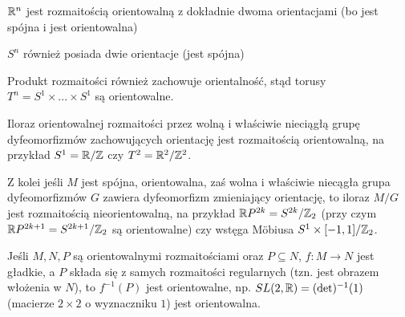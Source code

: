 \begin{example}
\item $\mathbb{R}^n$ jest rozmaitością orientowalną z dokładnie dwoma orientacjami (bo jest spójna i jest orientowalna)
\item $S^n$ również posiada dwie orientacje (jest spójna)
\item Produkt rozmaitości również zachowuje orientalność, stąd torusy $T^n=S^1\times...\times S^1$ są orientowalne.
\item Iloraz orientowalnej rozmaitości przez wolną i właściwie nieciągłą grupę dyfeomorfizmów zachowujących orientację jest rozmaitością orientowalną, na przykład $S^1=\mathbb{R}/\mathbb{Z}$ czy $T^2=\mathbb{R}^2/\mathbb{Z}^2$. 

  Z kolei jeśli $M$ jest spójna, orientowalna, zaś wolna i właściwie niecągła grupa dyfeomorfizmów $G$ zawiera dyfeomorfizm zmieniający orientację, to iloraz $M/G$ jest rozmaitością nieorientowalną, na przykład $\mathbb{R} P^{2k}=S^{2k}/\mathbb{Z}_2$ (przy czym $\mathbb{R} P^{2k+1}=S^{2k+1}/\mathbb{Z}_2$ są orientowalne) czy wstęga M\"obiusa $S^1\times [-1,1]/\mathbb{Z}_2$.
\item Jeśli $M,N,P$ są orientowalnymi rozmaitościami oraz $P\subseteq N$, $f:M\to N$ jest gładkie, a $P$ składa się z samych rozmaitości regularnych (tzn. jest obrazem włożenia w $N$), to $f^{-1}(P)$ jest orientowalne, np. $SL(2,\mathbb{R})=(\det)^{-1}(1)$ (macierze $2\times2$ o wyznaczniku $1$) jest orientowalna.
\end{example}


